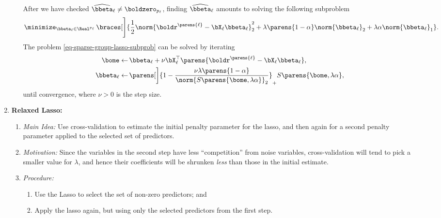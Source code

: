 \documentclass[12pt]{article}
\begin{document}
\begin{enumerate}[label=\textbf{\arabic*.}]
\begin{enumerate}
		After we have checked $\widehat{\bbeta}_{\ell} \neq \boldzero_{p_\ell}$, finding $\widehat{\bbeta}_{\ell}$ amounts to solving the following subproblem 
		\begin{align}\label{eq-sparse-group-lasso-subprob}
			\minimize_{\bbeta_{\ell} \in \Real^{p_{\ell}}} \, \braces[\Bigg]{\frac{1}{2} \norm{\boldr^{\parens{\ell}} - \bX_{\ell} \bbeta_{\ell}}_2^2 + \lambda \parens{1 - \alpha} \norm{\bbeta_{\ell}}_2 + \lambda \alpha \norm{\bbeta_{\ell}}_1}. 
		\end{align}
		The problem \eqref{eq-sparse-group-lasso-subprob} can be solved by iterating 
		\begin{align*}
			\bome \leftarrow & \, \bbeta_\ell + \nu \bX_{\ell}^{\top} \parens{\boldr^{\parens{\ell}} - \bX_{\ell} \bbeta_{\ell}}, \\ 
			\bbeta_{\ell} \leftarrow & \, \parens[\bigg]{1 - \frac{\nu \lambda \parens{1 - \alpha}}{\norm{S \parens{\bome, \lambda \alpha}}_2}}_+ S \parens{\bome, \lambda \alpha}, 
		\end{align*}
		until convergence, where $\nu > 0$ is the step size. 

	\end{enumerate}
	
	\item \textbf{Relaxed Lasso:} 
	\begin{enumerate}
		\item \textit{Main Idea:} Use cross-validation to estimate the initial penalty parameter for the lasso, and then again for a second penalty parameter applied to the selected set of predictors. 

		\item \textit{Motivation:}  Since the variables in the second step have less ``competition'' from noise variables, cross-validation will tend to pick a smaller value for $\lambda$, and hence their coefficients will be shrunken \emph{less} than those in the initial estimate. 
		
		\item \textit{Procedure:} 
		\begin{enumerate}
			\item Use the Lasso to select the set of non-zero predictors; and 
			\item Apply the lasso again, but using only the selected predictors from the first step. 
		\end{enumerate}
		
	\end{enumerate}
	

\end{enumerate}
\end{document}
